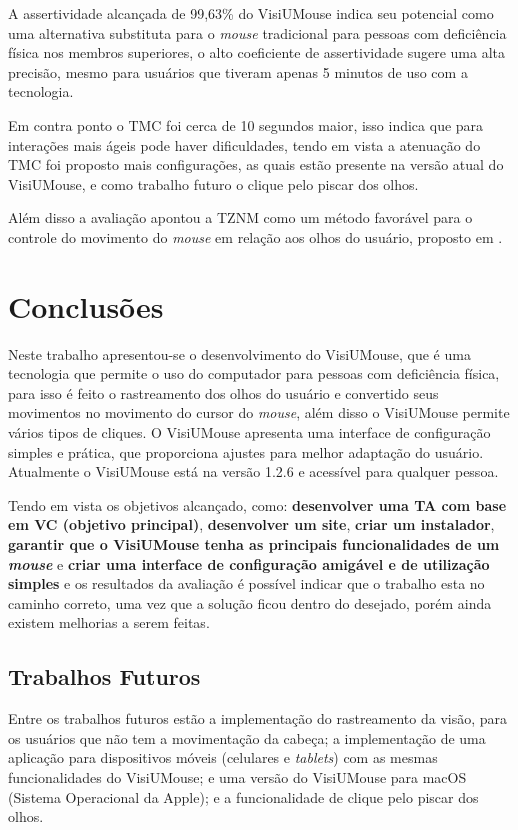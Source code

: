 A assertividade alcançada de 99,63\% do VisiUMouse indica seu potencial como uma alternativa substituta para o \textit{mouse} tradicional para pessoas com deficiência física nos membros superiores, o alto coeficiente de assertividade sugere uma alta precisão, mesmo para usuários que tiveram apenas 5 minutos de uso com a tecnologia.

Em contra ponto o TMC foi cerca de 10 segundos maior, isso indica que para interações mais ágeis pode haver dificuldades, tendo em vista a atenuação do TMC foi proposto mais configurações, as quais estão presente na versão atual do VisiUMouse, e como trabalho futuro o clique pelo piscar dos olhos.

Além disso a avaliação apontou a TZNM como um método favorável para o controle do movimento do \textit{mouse} em relação aos olhos do usuário, proposto em \cite{xavier2017visiumouse}.


\chapter{Conclusões}\label{CAP-consideracoes-finais-trabalhos-futuros}
Neste trabalho apresentou-se o desenvolvimento do VisiUMouse, que é uma tecnologia que permite o uso do computador para pessoas com deficiência física, para isso é feito o rastreamento dos olhos do usuário e convertido seus movimentos no movimento do cursor do \textit{mouse}, além disso o VisiUMouse permite vários tipos de cliques. O VisiUMouse apresenta uma interface de configuração simples e prática, que proporciona ajustes para melhor adaptação do usuário. Atualmente o VisiUMouse está na versão 1.2.6 e acessível para qualquer pessoa.

Tendo em vista os objetivos alcançado, como: \textbf{desenvolver uma TA com base em VC (objetivo principal)}, \textbf{desenvolver um site}, \textbf{criar um instalador}, \textbf{garantir que o VisiUMouse tenha as principais funcionalidades de um \textit{mouse}} e \textbf{criar uma interface de configuração amigável e de utilização simples} e os resultados da avaliação é possível indicar que o trabalho esta no caminho correto, uma vez que a solução ficou dentro do desejado, porém ainda existem melhorias a serem feitas.

\section{Trabalhos Futuros}

Entre os trabalhos futuros estão a implementação do rastreamento da visão, para os usuários que não tem a movimentação da cabeça; a implementação de uma aplicação para dispositivos móveis (celulares e \textit{tablets}) com as mesmas funcionalidades do VisiUMouse; e uma versão do VisiUMouse para macOS (Sistema Operacional da Apple); e a funcionalidade de clique pelo piscar dos olhos.

